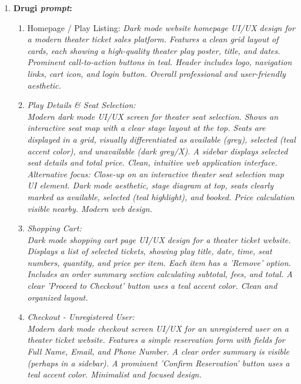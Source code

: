 \begin{itemize}
\begin{enumerate}[itemsep=1ex]
    \item \textbf{Drugi \textit{prompt}:}

          \begin{enumerate}[itemsep=0.5ex] %
              \item Homepage / Play Listing: \textit{Dark mode website homepage UI/UX design for a modern theater ticket sales platform. Features a clean grid layout of cards, each showing a high-quality theater play poster, title, and dates. Prominent call-to-action buttons in teal. Header includes logo, navigation links, cart icon, and login button. Overall professional and user-friendly aesthetic.}  \\

              \item \textit{Play Details \& Seat Selection: \\ Modern dark mode UI/UX screen for theater seat selection. Shows an interactive seat map with a clear stage layout at the top. Seats are displayed in a grid, visually differentiated as available (grey), selected (teal accent color), and unavailable (dark grey/X). A sidebar displays selected seat details and total price. Clean, intuitive web application interface. } \\

           \textit{ Alternative focus: Close-up on an interactive theater seat selection map UI element. Dark mode aesthetic, stage diagram at top, seats clearly marked as available, selected (teal highlight), and booked. Price calculation visible nearby. Modern web design.}  \\

              \item \textit{Shopping Cart:\\ Dark mode shopping cart page UI/UX design for a theater ticket website. Displays a list of selected tickets, showing play title, date, time, seat numbers, quantity, and price per item. Each item has a 'Remove' option. Includes an order summary section calculating subtotal, fees, and total. A clear 'Proceed to Checkout' button uses a teal accent color. Clean and organized layout.} \\

              \item \textit{ Checkout - Unregistered User: \\Modern dark mode checkout screen UI/UX for an unregistered user on a theater ticket website. Features a simple reservation form with fields for Full Name, Email, and Phone Number. A clear order summary is visible (perhaps in a sidebar). A prominent 'Confirm Reservation' button  uses a teal accent color. Minimalist and focused design.} \\


\end{enumerate}
\end{enumerate}
\end{itemize}
